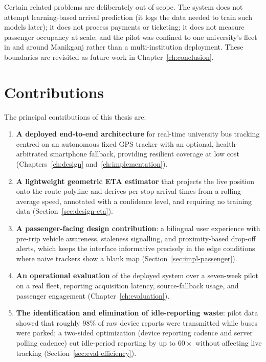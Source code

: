 Certain related problems are deliberately out of scope. The system does
not attempt learning-based arrival prediction (it logs the data needed to
train such models later); it does not process payments or ticketing; it
does not measure passenger occupancy at scale; and the pilot was confined
to one university's fleet in and around Manikganj rather than a
multi-institution deployment. These boundaries are revisited as future
work in Chapter~\ref{ch:conclusion}.

\section{Contributions}
The principal contributions of this thesis are:

\begin{enumerate}
  \item \textbf{A deployed end-to-end architecture} for real-time
  university bus tracking centred on an autonomous fixed GPS tracker with
  an optional, health-arbitrated smartphone fallback, providing resilient
  coverage at low cost (Chapters~\ref{ch:design}
  and~\ref{ch:implementation}).
  \item \textbf{A lightweight geometric ETA estimator} that projects the
  live position onto the route polyline and derives per-stop arrival times
  from a rolling-average speed, annotated with a confidence level, and
  requiring no training data (Section~\ref{sec:design-eta}).
  \item \textbf{A passenger-facing design contribution}: a bilingual user
  experience with pre-trip vehicle awareness, staleness signalling, and
  proximity-based drop-off alerts, which keeps the interface informative
  precisely in the edge conditions where naive trackers show a blank map
  (Section~\ref{sec:impl-passenger}).
  \item \textbf{An operational evaluation} of the deployed system over a
  seven-week pilot on a real fleet, reporting acquisition latency,
  source-fallback usage, and passenger engagement
  (Chapter~\ref{ch:evaluation}).
  \item \textbf{The identification and elimination of idle-reporting
  waste}: pilot data showed that roughly 98\% of raw device reports were
  transmitted while buses were parked; a two-sided optimization (device
  reporting cadence and server polling cadence) cut idle-period reporting
  by up to $60\times$ without affecting live tracking
  (Section~\ref{sec:eval-efficiency}).
\end{enumerate}

